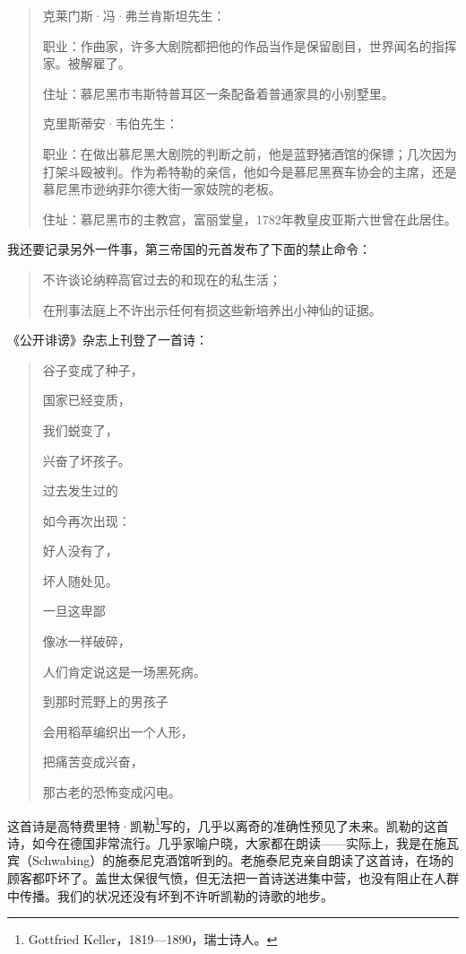 \documentclass[UTF8]{ctexart}
\begin{document}
\begin{quote}
克莱门斯·冯·弗兰肯斯坦先生：

职业：作曲家，许多大剧院都把他的作品当作是保留剧目，世界闻名的指挥家。被解雇了。

住址：慕尼黑市韦斯特普耳区一条配备着普通家具的小别墅里。

克里斯蒂安·韦伯先生：

职业：在做出慕尼黑大剧院的判断之前，他是蓝野猪酒馆的保镖；几次因为打架斗殴被判。作为希特勒的亲信，他如今是慕尼黑赛车协会的主席，还是慕尼黑市逊纳菲尔德大街一家妓院的老板。

住址：慕尼黑市的主教宫，富丽堂皇，1782年教皇皮亚斯六世曾在此居住。

\end{quote}

我还要记录另外一件事，第三帝国的元首发布了下面的禁止命令：

\begin{quote}
不许谈论纳粹高官过去的和现在的私生活；

在刑事法庭上不许出示任何有损这些新培养出小神仙的证据。
\end{quote}

《公开诽谤》杂志上刊登了一首诗：

\begin{verse}
谷子变成了种子，

国家已经变质，

我们蜕变了，

兴奋了坏孩子。

过去发生过的

如今再次出现：

好人没有了，

坏人随处见。

一旦这卑鄙

像冰一样破碎，

人们肯定说这是一场黑死病。

到那时荒野上的男孩子

会用稻草编织出一个人形，

把痛苦变成兴奋，

那古老的恐怖变成闪电。
\end{verse}

这首诗是高特费里特·凯勒\footnote{Gottfried Keller，1819—1890，瑞士诗人。}写的，几乎以离奇的准确性预见了未来。凯勒的这首诗，如今在德国非常流行。几乎家喻户晓，大家都在朗读——实际上，我是在施瓦宾（Schwabing）的施泰尼克酒馆听到的。老施泰尼克亲自朗读了这首诗，在场的顾客都吓坏了。盖世太保很气愤，但无法把一首诗送进集中营，也没有阻止在人群中传播。我们的状况还没有坏到不许听凯勒的诗歌的地步。
\end{document}
